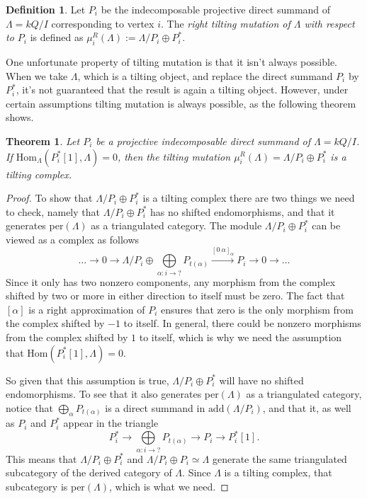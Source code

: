 \documentclass[12pt, dvipsnames, oneside]{amsart}
\newtheorem{theorem}{Theorem}[section]
\theoremstyle{definition}
\newtheorem{definition}{Definition}[section]
\newcommand{\Hom}{\text{Hom}}
\begin{document}
\bigskip

\begin{definition}
Let $P_i$ be the indecomposable projective direct summand of $\Lambda=kQ/I$ corresponding to vertex $i$. The \emph{right tilting mutation of $\Lambda$ with respect to $P_i$} is defined as $\mu_i^R (\Lambda) :=\Lambda/P_i \oplus P_i^*$.
\end{definition}

\bigskip

One unfortunate property of tilting mutation is that it isn't always possible. When we take $\Lambda$, which is a tilting object, and replace the direct summand $P_i$ by $P_i^*$, it's not guaranteed that the result is again a tilting object.
However, under certain assumptions tilting mutation is always possible, as the following theorem shows.

\bigskip

\begin{theorem}\label{thm:mutationAssumptions}
Let $P_i$ be a projective indecomposable direct summand of $\Lambda=kQ/I$. If $\Hom_\Lambda(P_i^*[1], \Lambda) = 0$, then the tilting mutation $\mu_i^R (\Lambda) = \Lambda/P_i \oplus P_i^*$ is a tilting complex.
\end{theorem}

\begin{proof}
To show that $\Lambda/P_i \oplus P_i^*$ is a tilting complex there are two things we need to check, namely that $\Lambda/P_i \oplus P_i^*$ has no shifted endomorphisms, and that it generates per$(\Lambda)$ as a triangulated category. The module $\Lambda/P_i \oplus P_i^*$ can be viewed as a complex as follows
$$\dots\rightarrow 0 \rightarrow \Lambda/P_i \oplus \bigoplus\limits_{\alpha:i\rightarrow ?} P_{t(\alpha)} \xrightarrow{[0 \ \alpha]_\alpha} P_i \rightarrow 0 \rightarrow \dots$$
Since it only has two nonzero components, any morphism from the complex shifted by two or more in either direction to itself must be zero. The fact that $[\alpha]$ is a right approximation of $P_i$ ensures that zero is the only morphism from the complex shifted by $-1$ to itself. In general, there could be nonzero morphisms from the complex shifted by $1$ to itself, which is why we need the assumption that $\Hom(P_i^*[1], \Lambda)=0$.
 
So given that this assumption is true, $\Lambda/P_i\oplus P_i^*$ will have no shifted endomorphisms. 
To see that it also generates per$(\Lambda)$ as a triangulated category, notice that $\bigoplus_{\alpha}P_{t(\alpha)}$ is a direct summand in $\text{add}(\Lambda/P_i)$, and that it, as well as $P_i$ and $P_i^*$ appear in the triangle
\begin{equation*}
P_i^*\rightarrow \bigoplus\limits_{\alpha: i\rightarrow ?} P_{t(\alpha)} \rightarrow P_i \rightarrow P_i^*[1].
\end{equation*}
This means that $\Lambda/P_i\oplus P_i^*$ and $\Lambda/P_i \oplus P_i\simeq \Lambda$ generate the same triangulated subcategory of the derived category of $\Lambda$. Since $\Lambda$ is a tilting complex, that subcategory is per$(\Lambda)$, which is what we need.
\end{proof}
\end{document}
